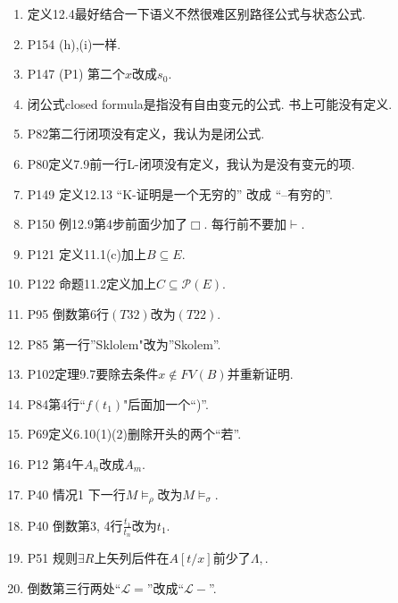 \documentclass{article}
\begin{document}
\begin{enumerate}
\item 定义12.4最好结合一下语义不然很难区别路径公式与状态公式. 
\item P154 (h),(i)一样. 
\item P147 (P1) 第二个$x$改成$s_0$. 
\item 闭公式closed formula是指没有自由变元的公式. 书上可能没有定义. 
\item P82第二行闭项没有定义，我认为是闭公式. 
\item P80定义7.9前一行L-闭项没有定义，我认为是没有变元的项. 
\item P149 定义12.13 ``K-证明是一个无穷的'' 改成 ``--有穷的''. 
\item P150 例12.9第4步前面少加了$\Box$. 每行前不要加$\vdash$. 
\item P121 定义11.1(c)加上$B\subseteq E$. 
\item P122 命题11.2定义加上$C\subseteq \mathcal{P}(E)$. 
\item P95 倒数第6行$(T32)$改为$(T22)$. 
\item P85 第一行''Sklolem"改为''Skolem''. 
\item P102定理9.7要除去条件$x\notin FV(B)$并重新证明. 
\item P84第4行``$f(t_1)$"后面加一个``)''. 
\item P69定义6.10(1)(2)删除开头的两个``若''. 
\item P12 第4午$A_n$改成$A_m$. 
\item P40 情况1 下一行$M\models_\rho$改为$M\models_\sigma$. 
\item P40 倒数第3, 4行$\frac{t_1}{t_n}$改为$t_1$. 
\item P51 规则$\exists R$上矢列后件在$A[t/x]$前少了$\Lambda, $. 
\item 倒数第三行两处``$\mathscr{L}=$''改成``$\mathscr{L}-$''. 
\end{enumerate}
\end{document}
